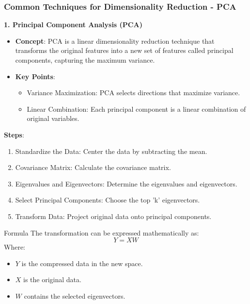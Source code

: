 \documentclass[aspectratio=169]{beamer}
\begin{document}
\begin{frame}[fragile]
    \frametitle{Common Techniques for Dimensionality Reduction - PCA}
    \textbf{1. Principal Component Analysis (PCA)}
    
    \begin{itemize}
        \item \textbf{Concept}: PCA is a linear dimensionality reduction technique that transforms the original features into a new set of features called principal components, capturing the maximum variance.
        \item \textbf{Key Points}:
        \begin{itemize}
            \item Variance Maximization: PCA selects directions that maximize variance.
            \item Linear Combination: Each principal component is a linear combination of original variables.
        \end{itemize}
    \end{itemize}
    
    \textbf{Steps}:
    \begin{enumerate}
        \item Standardize the Data: Center the data by subtracting the mean.
        \item Covariance Matrix: Calculate the covariance matrix.
        \item Eigenvalues and Eigenvectors: Determine the eigenvalues and eigenvectors.
        \item Select Principal Components: Choose the top 'k' eigenvectors.
        \item Transform Data: Project original data onto principal components.
    \end{enumerate}
    
    \begin{block}{Formula}
        The transformation can be expressed mathematically as:
        \begin{equation}
            Y = XW
        \end{equation}
        Where:
        \begin{itemize}
            \item $Y$ is the compressed data in the new space.
            \item $X$ is the original data.
            \item $W$ contains the selected eigenvectors.
        \end{itemize}
    \end{block}
\end{frame}
\end{document}
